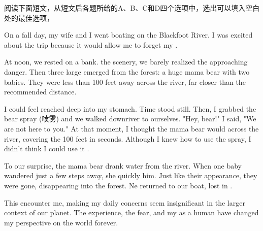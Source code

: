 \documentclass{英语试卷}
\begin{document}
\par 阅读下面短文，从短文后各题所给的A、B、C和D四个选项中，选出可以填入空白处的最佳选项，\par
\par On a fall day, my wife and I went boating on the Blackfoot River. I was excited about the trip because it would allow me to forget my .\par
\par At noon, we rested on a bank.  the scenery, we barely realized the approaching danger. Then three large  emerged from the forest: a huge mama bear with two babies. They were less than 100 feet away across the river, far closer than the recommended  distance.\par
\par I could feel  reached deep into my stomach. Time stood still. Then, I grabbed the bear spray (喷雾) and we walked downriver to  ourselves. "Hey, bear!" I said, "We are not here to  you." At that moment, I thought the mama bear would  across the river, covering the 100 feet in seconds. Although I knew how to use the spray, I didn't think I could use it .\par
\par To our surprise, the mama bear  drank water from the river. When one baby wandered just a few steps away, she quickly  him. Just like their  appearance, they were gone, disappearing into the forest. Ne returned to our boat, lost in .\par
\par This encounter  me, making my daily concerns seem insignificant in the larger context of our planet. The experience, the fear, and my  as a human have changed my perspective on the world forever.\par
{}
\end{document}
